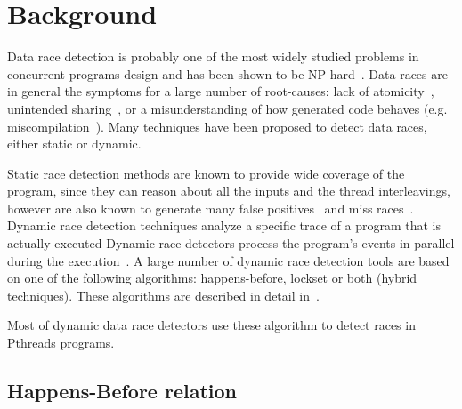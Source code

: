 \section{Background}
\label{sec:background}

Data race detection is probably one of the most widely studied problems in
concurrent programs design and has been shown to be
NP-hard~\cite{netzer-miller}.
%
Data races are in general the symptoms for a large number of root-causes: lack
of atomicity~\cite{usenix-race-erickson-et-al}, unintended
sharing~\cite{race-rv-2012-talk}, or a misunderstanding of how generated code
behaves (e.g. miscompilation~\cite{Boehm:2011:MPB:2001252.2001255}).
%
Many techniques have been proposed to detect data races, either static or
dynamic.

Static race detection methods are known to provide wide coverage of the
program, since they can reason about all the inputs and the thread
interleavings, however are also known to generate many false
positives~\cite{Pratikakis:2011:LPS:1889997.1890000} and miss
races~\cite{Voung:2007:RSR:1287624.1287654}.
%
Dynamic race detection techniques analyze a specific trace of a program
that is actually executed
%
Dynamic race detectors process the program’s events in parallel during the
execution~\cite{Lamport:1978:TCO:359545.359563, Savage:1997:EDD:269005.266641,
  Flanagan:2009, tsan}.
%
A large number of dynamic race detection tools are based on one of the
following algorithms: happens-before, lockset or both (hybrid techniques).
%
These algorithms are described in detail
in~\cite{O'Callahan:2003:HDD:966049.781528}.

Most of dynamic data race detectors use these algorithm to detect races in
Pthreads programs.
%

\subsection{Happens-Before relation}
\label{subsec:happensbefore}



